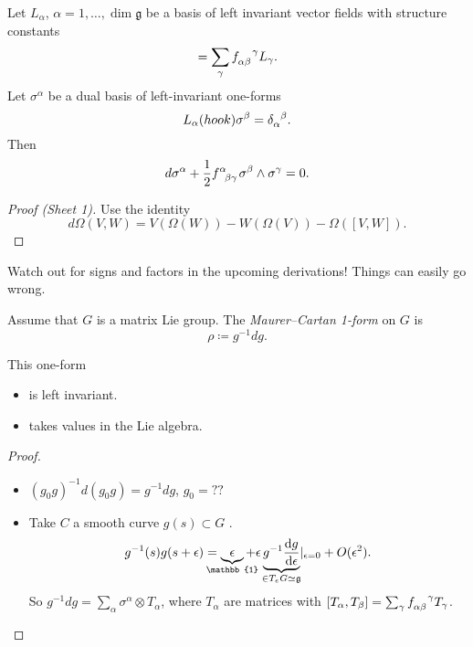 \begin{claim}
  Let $L_{\alpha}$, $\alpha = 1, \dots, \dim \mathfrak{g}$ be a basis of left invariant vector fields with structure constants
  \begin{equation}
    [L_{\alpha}, L_{\beta}] = \sum_\gamma f\indices{_{\alpha\beta}^{\gamma}}L_{\gamma}.
  \end{equation}
  Let $\sigma^{\alpha}$ be a dual basis of left-invariant one-forms
  \begin{equation}
    L_{\alpha} (hook) \sigma^{\beta} = \delta\indices{_{\alpha}^{\beta}}.
  \end{equation}
  Then
  \begin{equation}
    d\sigma^{\alpha} + \frac{1}{2} f\indices{^{\alpha}_{\beta\gamma}} \sigma^{\beta} \wedge \sigma^{\gamma} = 0 \label{eq:4-star}.
  \end{equation}
\end{claim}
\begin{proof}[Proof (Sheet 1)]
  Use the identity
  \begin{equation}
    d \Omega( V, W) = V(\Omega(W)) - W(\Omega(V)) - \Omega([V, W]).
  \end{equation}
\end{proof}
\begin{leftbar}
  Watch out for signs and factors in the upcoming derivations! Things can easily go wrong.
\end{leftbar}

\begin{definition}
  Assume that $G$ is a matrix Lie group.
  The \emph{Maurer--Cartan 1-form} on $G$ is
  \begin{equation}
    \rho \coloneqq g^{-1} d g.
  \end{equation}
\end{definition}
\begin{claim}
  This one-form
  \begin{itemize}
    \item is left invariant.
    \item takes values in the Lie algebra.
  \end{itemize}
\end{claim}
\begin{proof}
  \begin{itemize}
    \item $(g_0 g)^{-1} d(g_0 g) = g^{-1} dg$, $g_0 = ??$
    \item Take $C$  a smooth curve $g(s) \subset G$ .
    \begin{equation}
      g^{-1}(s) g(s + \epsilon) = \underbrace{\epsilon}_{\mathclap{\mathbb{1}}} + \epsilon \underbrace{g^{-1} \dv{g}{\epsilon}}_{\mathclap{\in T_e G \simeq \mathfrak{g}}} \rvert_{\epsilon = 0} + O(\epsilon^2).
    \end{equation}
    So $g^{-1} d g = \sum_\alpha \sigma^{\alpha} \otimes T_\alpha$, where $T_\alpha$ are matrices with $[T_\alpha, T_\beta] = \sum_\gamma f\indices{_{\alpha\beta}^\gamma} T_{\gamma}$.
  \end{itemize}
\end{proof}

